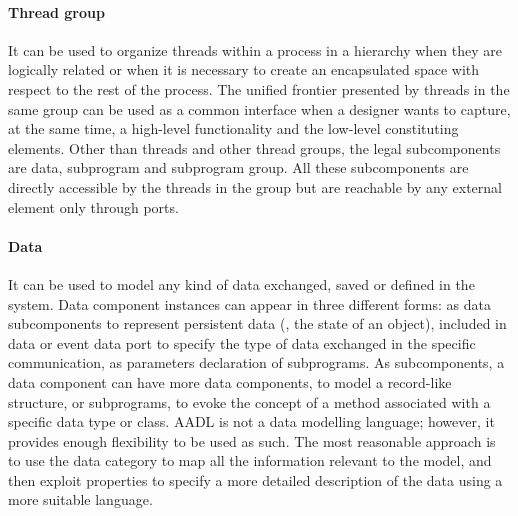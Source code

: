 \paragraph{Thread group} It can be used to organize threads within a process in a hierarchy when they are logically related or when it is necessary to create an encapsulated space with respect to the rest of the process. The unified frontier presented by threads in the same group can be used as a common interface when a designer wants to capture, at the same time, a high-level functionality and the low-level constituting elements. Other than threads and other thread groups, the legal subcomponents are data, subprogram and subprogram group. All these subcomponents are directly accessible by the threads in the group but are reachable by any external element only through ports.

\paragraph{Data} It can be used to model any kind of data exchanged, saved or defined in the system. Data component instances can appear in three different forms: as data subcomponents to represent persistent data (\eg, the state of an object), included in data or event data port to specify the type of data exchanged in the specific communication, as parameters declaration of subprograms. As subcomponents, a data component can have more data components, to model a record-like structure, or subprograms, to evoke the concept of a method associated with a specific data type or class. AADL is not a data modelling language; however, it provides enough flexibility to be used as such. The most reasonable approach is to use the data category to map all the information relevant to the model, and then exploit properties to specify a more detailed description of the data using a more suitable language.

